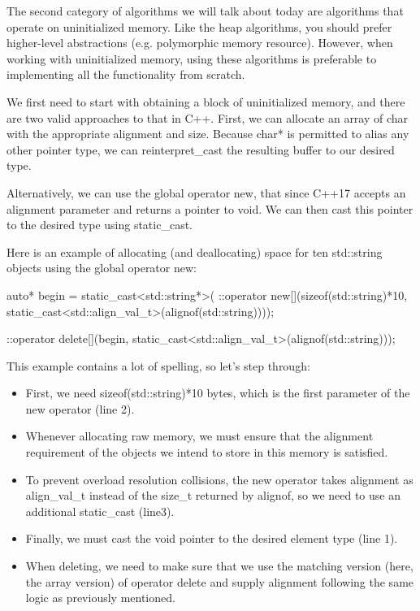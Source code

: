 The second category of algorithms we will talk about today are algorithms that operate on uninitialized memory. Like the heap algorithms, you should prefer higher-level abstractions (e.g. polymorphic memory resource). However, when working with uninitialized memory, using these algorithms is preferable to implementing all the functionality from scratch.

We first need to start with obtaining a block of uninitialized memory, and there are two valid approaches to that in C++. First, we can allocate an array of char with the appropriate alignment and size. Because char* is permitted to alias any other pointer type, we can reinterpret\_cast the resulting buffer to our desired type.

Alternatively, we can use the global operator new, that since C++17 accepts an alignment parameter and returns a pointer to void. We can then cast this pointer to the desired type using static\_cast.

Here is an example of allocating (and deallocating) space for ten std::string objects using the global operator new:

\begin{box-note}
\begin{cppcode}
auto* begin = static_cast<std::string*>(
                  ::operator new[](sizeof(std::string)*10, 
                                   static_cast<std::align_val_t>(alignof(std::string))));

::operator delete[](begin, static_cast<std::align_val_t>(alignof(std::string)));
\end{cppcode}
\end{box-note}

This example contains a lot of spelling, so let’s step through:

\begin{itemize}
    \item First, we need sizeof(std::string)*10 bytes, which is the first parameter of the new operator (line 2).
    \item Whenever allocating raw memory, we must ensure that the alignment requirement of the objects we intend to store in this memory is satisfied.
    \item To prevent overload resolution collisions, the new operator takes alignment as align\_val\_t instead of the size\_t returned by alignof, so we need to use an additional static\_cast (line3).
    \item Finally, we must cast the void pointer to the desired element type (line 1).
    \item When deleting, we need to make sure that we use the matching version (here, the array version) of operator delete and supply alignment following the same logic as previously mentioned.
\end{itemize}

